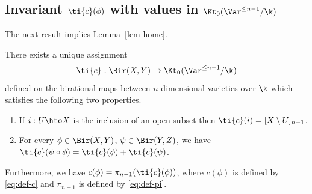 \subsection{Invariant $\ti{c}(\phi)$ with values in $\Kt_0(\Var^{\le n-1}/\k)$}\label{ssec-leftK}


The next result implies Lemma~\ref{lem-homc}.

\begin{theorem}
\notready\label{thm-Defc}
There exists a unique assignment
\[
\ti{c}: \Bir(X,Y) \to \Kt_0(\Var^{\le{n-1}}/\k)
\]
defined on the birational maps
between $n$-dimensional varieties over $\k$ which
satisfies the following two properties.
\begin{enumerate}
    \item If $i: U \hto X$ is the inclusion of an open subset
    then $\ti{c}(i) = [X \setminus U]_{n-1}$.
    \item For every $\phi \in \Bir(X, Y)$, $\psi \in \Bir(Y,Z)$,
    we have $\ti{c}(\psi \circ \phi) = \ti{c}(\phi) + \ti{c}(\psi)$.
\end{enumerate}
Furthermore, we have $c(\phi) = \pi_{n-1}(\ti{c}(\phi))$,
where $c(\phi)$ is defined by \eqref{eq:def-c} and
$\pi_{n-1}$ is defined by \eqref{eq:def-pi}.
\end{theorem}

